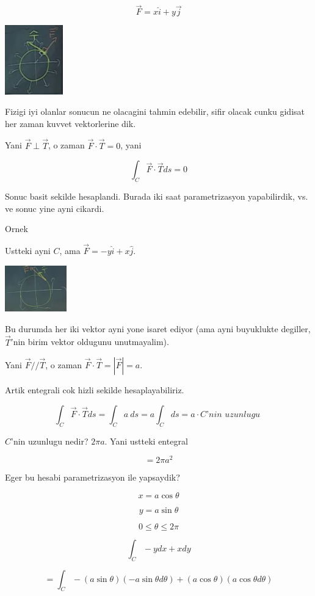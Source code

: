\documentclass[12pt,fleqn]{article}\usepackage{../common}
\begin{document}
\[ \vec{F} = x\hat{i} + y\vec{j} \]

\includegraphics[height=3cm]{19_13.png}

Fizigi iyi olanlar sonucun ne olacagini tahmin edebilir, sifir olacak cunku
gidisat her zaman kuvvet vektorlerine dik. 

Yani $\vec{F} \perp \vec{T}$, o zaman $\vec{F} \cdot \vec{T} = 0$, yani

\[  \int_C \vec{F} \cdot \vec{T} ds = 0\]

Sonuc basit sekilde hesaplandi. Burada iki saat parametrizasyon
yapabilirdik, vs. ve sonuc yine ayni cikardi. 

Ornek

Ustteki ayni $C$, ama $\vec{F} = -y\hat{i} + x\hat{j}$. 

\includegraphics[height=2cm]{19_14.png}

Bu durumda her iki vektor ayni yone isaret ediyor (ama ayni buyuklukte
degiller, $\vec{T}$'nin birim vektor oldugunu unutmayalim). 

Yani $\vec{F} // \vec{T}$, o zaman $\vec{F} \cdot \vec{T} = |\vec{F}| =
a$.

Artik entegrali cok hizli sekilde hesaplayabiliriz. 

\[  \int_C \vec{F} \cdot \vec{T} ds 
=  \int_C a \ ds 
= a  \int_C ds 
= a \cdot C \textit{'nin uzunlugu }
\]

$C$'nin uzunlugu nedir? $2\pi a$. Yani ustteki entegral

\[ = 2\pi a^2 \]

Eger bu hesabi parametrizasyon ile yapsaydik? 

\[ x = a\cos\theta \]

\[ y = a\sin\theta \]

\[ 0 \le \theta \le 2\pi \]

\[ \int_C -y dx + x dy \]


\[ = \int_C -(a\sin\theta)(-a\sin\theta d\theta) + 
(a\cos\theta)(a \cos\theta d\theta)
\]
\end{document}
